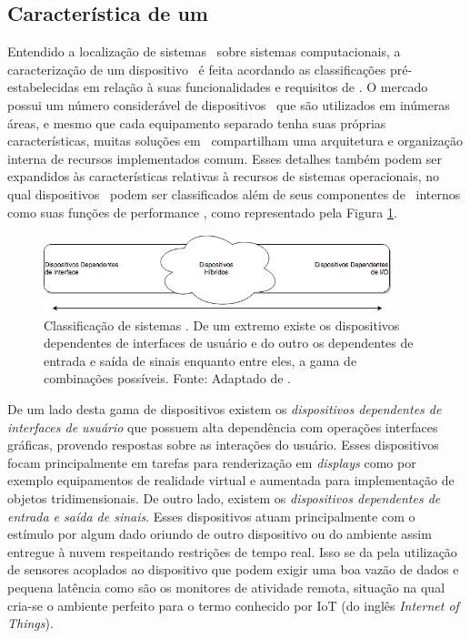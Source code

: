 	\subsection{Característica de um \Wearable}
		Entendido a localização de sistemas \wearable\ sobre sistemas computacionais, a caracterização de um dispositivo \wearable\ é feita acordando as classificações pré-estabelecidas em relação à suas funcionalidades e requisitos de \hardware.
      O mercado possui um número considerável de dispositivos \wearables\ que são utilizados em inúmeras áreas, e mesmo que cada equipamento separado tenha suas próprias características, muitas soluções em \hardware\ compartilham uma arquitetura e organização interna de recursos implementados comum.
		Esses detalhes também podem ser expandidos às características relativas à recursos de sistemas operacionais, no qual dispositivos \wearables\ podem ser classificados além de seus componentes de \hardware\ internos como suas funções de performance \citep{Delabrida2016, Amorim2017}, como representado pela Figura \ref{fig:classification}.

		\begin{figure}[h] \centering
			\vspace{-5pt}
			\includegraphics[width=0.9\textwidth]{img/rt-gradiente.png}
			\caption{Classificação de sistemas \wearables. De um extremo existe os dispositivos dependentes de interfaces de usuário e do outro os dependentes de entrada e saída de sinais enquanto entre eles, a gama de combinações possíveis. Fonte: Adaptado de \citep{Amorim2017}.}
			\label{fig:classification}
		\end{figure}

		De um lado desta gama de dispositivos existem os \emph{dispositivos dependentes de interfaces de usuário} que possuem alta dependência com operações interfaces gráficas, provendo respostas sobre as interações do usuário.
      Esses dispositivos focam principalmente em tarefas para renderização em \textit{displays} como por exemplo equipamentos de realidade virtual e aumentada para implementação de objetos tridimensionais.
		De outro lado, existem os \emph{dispositivos dependentes de entrada e saída de sinais}. Esses dispositivos atuam principalmente com o estímulo por algum dado oriundo de outro dispositivo ou do ambiente assim entregue à nuvem respeitando restrições de tempo real.
      Isso se da pela utilização de sensores acoplados ao dispositivo que podem exigir uma boa vazão de dados e pequena latência como são os monitores de atividade remota, situação na qual cria-se o ambiente perfeito para o termo conhecido por IoT (do inglês \textit{Internet of Things}).

